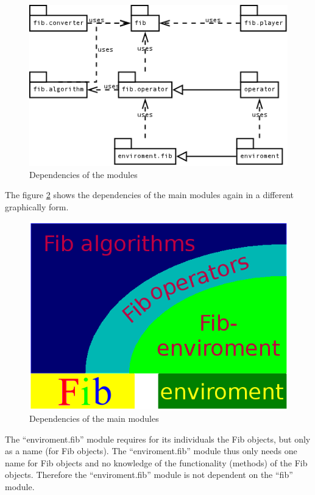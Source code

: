 \begin{figure}[htbp]
\begin{center}
  \includegraphics[scale=0.4]{modul_dependencies}
\end{center}
\caption{Dependencies of the modules}
\label{figModulDependencies}
\end{figure}

The figure \ref{figMainModulDependencies} shows the dependencies of the main modules again in a different graphically form.

\begin{figure}[htbp]
\begin{center}
  \includegraphics[scale=0.5]{project_dependencies}
\end{center}
\caption{Dependencies of the main modules}
\label{figMainModulDependencies}
\end{figure}

The ``enviroment.fib'' module requires for its individuals the Fib objects, but only as a name (for Fib objects). The ``enviroment.fib'' module thus only needs one name for Fib objects and no knowledge of the functionality (methods) of the Fib objects. Therefore the ``enviroment.fib'' module is not dependent on the ``fib'' module.

















